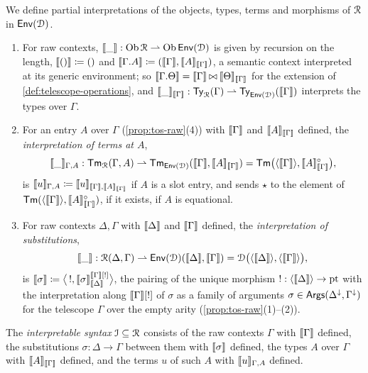 \begin{definition}\label{def:interpretation-contexts}
    We define partial interpretations of the objects, types, terms and morphisms of $\mathcal{R}$ in $\mathsf{Env}(\mathcal{D})$.
    \begin{enumerate}
        \item For raw contexts, $\llbracket\_\rrbracket : \operatorname{Ob}\mathcal{R} \rightharpoonup \operatorname{Ob}\mathsf{Env}(\mathcal{D})$ is given by recursion on the length, $\llbracket()\rrbracket \coloneqq ()$ and $\llbracket\Gamma.A\rrbracket \coloneqq (\llbracket\Gamma\rrbracket, \llbracket A\rrbracket_{\llbracket\Gamma\rrbracket})$, a semantic context interpreted at its generic environment; so $\llbracket\Gamma.\Theta\rrbracket = \llbracket\Gamma\rrbracket \mathbin{\bowtie} \llbracket\Theta\rrbracket_{\llbracket\Gamma\rrbracket}$ for the extension of \cref{def:telescope-operations}, and $\llbracket\_\rrbracket_{\llbracket\Gamma\rrbracket} : \mathsf{Ty}_{\mathcal{R}}(\Gamma) \rightharpoonup \mathsf{Ty}_{\mathsf{Env}(\mathcal{D})}(\llbracket\Gamma\rrbracket)$ interprets the types over $\Gamma$.
        \item For an entry $A$ over $\Gamma$ (\cref{prop:tos-raw}(4)) with $\llbracket\Gamma\rrbracket$ and $\llbracket A\rrbracket_{\llbracket\Gamma\rrbracket}$ defined, the \emph{interpretation of terms at $A$},
        \[
            \llbracket\_\rrbracket_{\Gamma, A} : \mathsf{Tm}_{\mathcal{R}}(\Gamma, A) \rightharpoonup \mathsf{Tm}_{\mathsf{Env}(\mathcal{D})}(\llbracket\Gamma\rrbracket, \llbracket A\rrbracket_{\llbracket\Gamma\rrbracket}) = \mathsf{Tm}\big(\langle \llbracket\Gamma\rrbracket \rangle, \llbracket A\rrbracket_{\llbracket\Gamma\rrbracket}^{\circ}\big),
        \]
        is $\llbracket u\rrbracket_{\Gamma, A} \coloneqq \llbracket u\rrbracket_{\llbracket\Gamma\rrbracket, \llbracket A\rrbracket_{\llbracket\Gamma\rrbracket}}$ if $A$ is a slot entry, and sends $\star$ to the element of $\mathsf{Tm}(\langle \llbracket\Gamma\rrbracket \rangle, \llbracket A\rrbracket_{\llbracket\Gamma\rrbracket}^{\circ})$, if it exists, if $A$ is equational.
        \item For raw contexts $\Delta, \Gamma$ with $\llbracket\Delta\rrbracket$ and $\llbracket\Gamma\rrbracket$ defined, the \emph{interpretation of substitutions},
        \[
            \llbracket\_\rrbracket : \mathcal{R}(\Delta, \Gamma) \rightharpoonup \mathsf{Env}(\mathcal{D})(\llbracket\Delta\rrbracket, \llbracket\Gamma\rrbracket) = \mathcal{D}\big(\langle \llbracket\Delta\rrbracket \rangle, \langle \llbracket\Gamma\rrbracket \rangle\big),
        \]
        is $\llbracket\sigma\rrbracket \coloneqq \big\langle\, {!}, \llbracket\sigma\rrbracket^{\llbracket\Gamma\rrbracket[!]}_{\llbracket\Delta\rrbracket} \big\rangle$, the pairing of the unique morphism ${!} : \langle \llbracket\Delta\rrbracket \rangle \to \mathrm{pt}$ with the interpretation along $\llbracket\Gamma\rrbracket[!]$ of $\sigma$ as a family of arguments $\sigma \in \mathsf{Args}(\Delta^{\downarrow}, \Gamma^{\downarrow})$ for the telescope $\Gamma$ over the empty arity (\cref{prop:tos-raw}(1)--(2)).
    \end{enumerate}
\end{definition}

\begin{definition}\label{def:interpretable}
    The \emph{interpretable syntax} $\mathcal{I} \subseteq \mathcal{R}$ consists of the raw contexts $\Gamma$ with $\llbracket\Gamma\rrbracket$ defined, the substitutions $\sigma : \Delta \to \Gamma$ between them with $\llbracket\sigma\rrbracket$ defined, the types $A$ over $\Gamma$ with $\llbracket A\rrbracket_{\llbracket\Gamma\rrbracket}$ defined, and the terms $u$ of such $A$ with $\llbracket u\rrbracket_{\Gamma, A}$ defined.
\end{definition}

